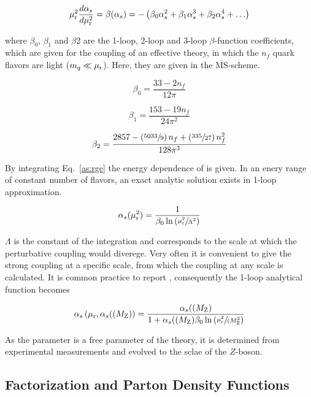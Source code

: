 \begin{equation}
    \mu_{\mathrm{r}}^2 \frac{d \alpha_{s}}{d \mu_{\mathrm{r}}^2} = \beta(\alpha_{s}) = - \left( \beta_0 \alpha_{s}^2 + \beta_1 \alpha_{s}^3
    + \beta_2 \alpha_{s}^4 + \ldots \right)
    \label{eq:as_rge}
\end{equation}

where $\beta_0$, $\beta_1$ and $\beta 2$ are the 1-loop, 2-loop and 3-loop 
$\beta$-function coefficients, which are given for the coupling of an effective
theory, in which the $n_f$ quark flavors are light ($m_q \ll \mu_{\mathrm{r}}$). Here, they
are given in the $\overline{\mathrm{MS}}$-scheme.

\begin{equation} 
    \beta_0 = \frac{33 - 2 n_f}{12\pi}
\end{equation}

\begin{equation} 
    \beta_1 = \frac{153 - 19 n_f}{24\pi^2}
\end{equation}

\begin{equation} 
   \beta_2 = \frac{2857 -\left(\sfrac{5033}{9}\right)n_f + \left(\sfrac{335}{27}
   \right)n_f^2}{128 \pi^3}
\end{equation}

By integrating Eq.~\ref{as:rge} the energy dependence of \as is given. In an
enery range of constant number of flavors, an exact analytic solution exists in
1-loop approximation. 

\begin{equation*}
   \alpha_{s}(\mu_{\mathrm{r}}^2) = \frac{1}{\beta_0 \ln \left( \sfrac{\mu_{\mathrm{r}}^2}{\Lambda^2} \right)}
\end{equation*}

$\Lambda$ is the constant of the integration and corresponds to the scale at
which the perturbative coupling would diverege. Very often it is convenient to
give the strong coupling at a specific scale, from which the coupling at any
scale is calculated. It is common practice to report \asmz, consequently the
1-loop analytical function becomes

\begin{equation*}
   \alpha_{s}\left(\mu_{\mathrm{r}}, \alpha_{s}((M_\mathrm{Z})\right) = \frac{\alpha_{s}((M_\mathrm{Z})}{1 + \alpha_{s}((M_\mathrm{Z})\beta_0 \ln
       \left( \sfrac{\mu_{\mathrm{r}}^2}{(M_\mathrm{Z}^2} \right)}
\end{equation*}

As the parameter is a free parameter of the theory, it is determined from
experimental measurements and evolved to the sclae of the $Z$-boson.

\subsection{Factorization and Parton Density Functions}

